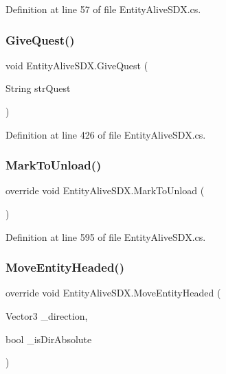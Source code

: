 Definition at line 57 of file Entity\+Alive\+S\+D\+X.\+cs.

\mbox{\label{class_entity_alive_s_d_x_a5540d79d7e8116d371151b982b8a6c6c}} 
\subsubsection{\texorpdfstring{GiveQuest()}{GiveQuest()}}
{\footnotesize\ttfamily void Entity\+Alive\+S\+D\+X.\+Give\+Quest (\begin{DoxyParamCaption}\item[{String}]{str\+Quest }\end{DoxyParamCaption})}



Definition at line 426 of file Entity\+Alive\+S\+D\+X.\+cs.

\mbox{\label{class_entity_alive_s_d_x_a19d698a3a5bae15499e84741ef5ab0c3}} 
\subsubsection{\texorpdfstring{MarkToUnload()}{MarkToUnload()}}
{\footnotesize\ttfamily override void Entity\+Alive\+S\+D\+X.\+Mark\+To\+Unload (\begin{DoxyParamCaption}{ }\end{DoxyParamCaption})}



Definition at line 595 of file Entity\+Alive\+S\+D\+X.\+cs.

\mbox{\label{class_entity_alive_s_d_x_a4085ffe371fe6c2c7d78f0ac6540d136}} 
\subsubsection{\texorpdfstring{MoveEntityHeaded()}{MoveEntityHeaded()}}
{\footnotesize\ttfamily override void Entity\+Alive\+S\+D\+X.\+Move\+Entity\+Headed (\begin{DoxyParamCaption}\item[{Vector3}]{\+\_\+direction,  }\item[{bool}]{\+\_\+is\+Dir\+Absolute }\end{DoxyParamCaption})}



